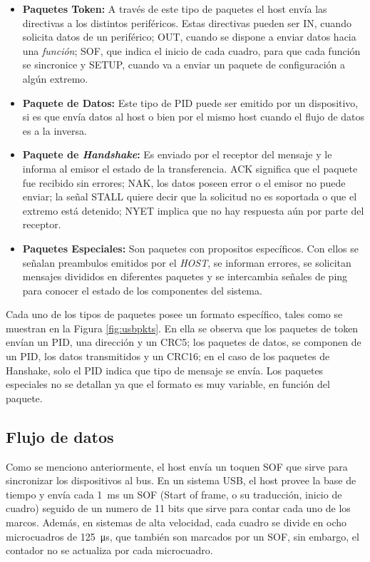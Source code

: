 	\begin{itemize}
		\item {\bf Paquetes Token:} A través de este tipo de paquetes el host envía las directivas a los distintos periféricos. Estas directivas pueden ser IN, cuando solicita datos de un periférico; OUT, cuando se dispone a enviar datos hacia una {\it función}; SOF, que indica el inicio de cada cuadro, para que cada función se sincronice y SETUP, cuando va a enviar un paquete de configuración a algún extremo.
		\item {\bf Paquete de Datos:} Este tipo de PID puede ser emitido por un dispositivo, si es que envía datos al host o bien por el mismo host cuando el flujo de datos es a la inversa.
		\item {\bf Paquete de {\it Handshake}:} Es enviado por el receptor del mensaje y le informa al emisor el estado de la transferencia. ACK significa que el paquete fue recibido sin errores; NAK, los datos poseen error o el emisor no puede enviar; la señal STALL quiere decir que la solicitud no es soportada o que el extremo está detenido; NYET implica que no hay respuesta aún por parte del receptor.
		\item {\bf Paquetes Especiales:} Son paquetes con propositos específicos. Con ellos se señalan preambulos emitidos por el {\it HOST}, se informan errores, se solicitan mensajes divididos en diferentes paquetes y se intercambia señales de ping para conocer el estado de los componentes del sistema.
	\end{itemize}
	
	Cada uno de los tipos de paquetes posee un formato específico, tales como se muestran en la Figura \ref{fig:usbpkts}. En ella se observa que los paquetes de token envían un PID, una dirección y un CRC5; los paquetes de datos, se componen de un PID, los datos transmitidos y un CRC16; en el caso de los paquetes de Hanshake, solo el PID indica que tipo de mensaje se envía. Los paquetes especiales no se detallan ya que el formato es muy variable, en función del paquete.\\
	
\subsection{Flujo de datos}
	Como se menciono anteriormente, el host envía un toquen SOF que sirve para sincronizar los dispositivos al bus. En un sistema USB, el host provee la base de tiempo y envía cada \SI{1}{\milli\second} un SOF (Start of frame, o su traducción, inicio de cuadro) seguido de un numero de 11 bits que sirve para contar cada uno de los marcos. Además, en sistemas de alta velocidad, cada cuadro se divide en ocho microcuadros de \SI{125}{\micro\second}, que también son marcados por un SOF, sin embargo, el contador no se actualiza por cada microcuadro.\\
	
